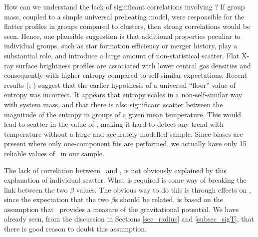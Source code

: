 \documentclass[usenatbib]{mn2e}
\begin{document}
How can we understand the lack of significant correlations involving \betafit? If
group mass, coupled to a simple universal preheating model, were responsible for
the flatter profiles in groups compared to clusters, then strong correlations
would be seen.  Hence, one plausible suggestion is that additional properties
peculiar to individual groups, such as star formation efficiency or merger
history, play a substantial role, and introduce a large amount of non-statistical
scatter.  Flat X-ray surface brightness profiles are associated with lower
central gas densities and consequently with higher entropy compared to
self-similar expectations.  Recent results (\citealt*{ponman03};
\citealt{pratt03,sun03,mushotsky03}) suggest that the earlier hypothesis
\citep{ponman99} of a universal ``floor'' value of entropy was incorrect. It
appears \citep{ponman03} that entropy scales in a non-self-similar way with
system mass, and that there is also significant scatter \citep{sun03,mushotsky03}
between the magnitude of the entropy in groups of a given mean temperature.  This
would lead to scatter in the value of \betafit, making it hard to detect any
trend with temperature without a large and accurately modelled sample. Since
biases are present where only one-component fits are performed, we actually have
only 15 reliable values of \betafit\ in our sample.

The lack of correlation between \betafit\ and \betaspec, is not obviously
explained by this explanation of individual scatter.  What is required is some
way of breaking the link between the two $\beta$ values.  The obvious way to do
this is through effects on \sigmav, since the expectation that the two $\beta$s
should be related, is based on the assumption that \sigmav\ provides a measure of
the gravitational potential.  We have already seen, from the discussion in
Sections \ref{sec_radius} and \ref{subsec_sigT}, that there is good reason to
doubt this assumption.
\end{document}
